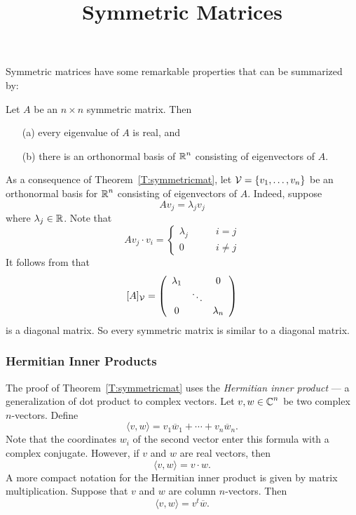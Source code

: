 \documentclass{ximera}
\title{Symmetric Matrices}
\begin{document}
\begin{abstract}
\end{abstract}
\maketitle


\label{S:symmetric}

Symmetric matrices have some remarkable properties that can be
summarized by:
\begin{theorem}  \label{T:symmetricmat}
Let $A$ be an $n\times n$ symmetric matrix.
Then
\begin{enumerate}
\item[(a)] every eigenvalue
of $A$ is real, and
\item[(b)] there is an orthonormal basis
of $\mbox{$\Bbb{R}$}^n$ consisting of
	eigenvectors of $A$.
\end{enumerate}
\end{theorem}

As a consequence of Theorem~\ref{T:symmetricmat}, let
${\cal V}=\{v_1,\ldots,v_n\}$ be an orthonormal basis for $\mbox{$\Bbb{R}$}^n$
consisting of eigenvectors of $A$.  Indeed, suppose
\[
Av_j = \lambda_jv_j
\]
where $\lambda_j\in\mbox{$\Bbb{R}$}$.  Note that
\[
Av_j\cdot v_i =  \left\{\begin{array}{rl} \lambda_j & \qquad i=j\\
			0 & \qquad i\neq j \end{array}\right.
\]
It follows from  that
\[
[A]_{\cal V}= \left(\begin{array}{ccc} \lambda_1 & & 0 \\  & \ddots & \\
	0 &  & \lambda_n \end{array}\right)
\]
is a diagonal matrix.  So every symmetric matrix is similar to a diagonal
matrix.

\subsubsection*{Hermitian Inner Products}

The proof of Theorem~\ref{T:symmetricmat} uses the {\em Hermitian inner
product} --- a generalization of
dot product to complex vectors.
Let $v,w\in\mbox{$\Bbb{C}$}^n$ be two complex $n$-vectors.  Define
\[
\langle v,w \rangle = v_1\overline{w}_1 + \cdots + v_n\overline{w}_n.
\]
Note that the coordinates $w_i$ of the second vector enter this formula
with a complex conjugate.  However, if $v$ and $w$ are real vectors, then
\[
\langle v,w \rangle = v\cdot w.
\]
A more compact notation for the Hermitian inner product is given by
matrix multiplication.
Suppose that $v$ and $w$ are column $n$-vectors.
Then
\[
\langle v,w \rangle = v^t\overline{w}.
\]
\end{document}
